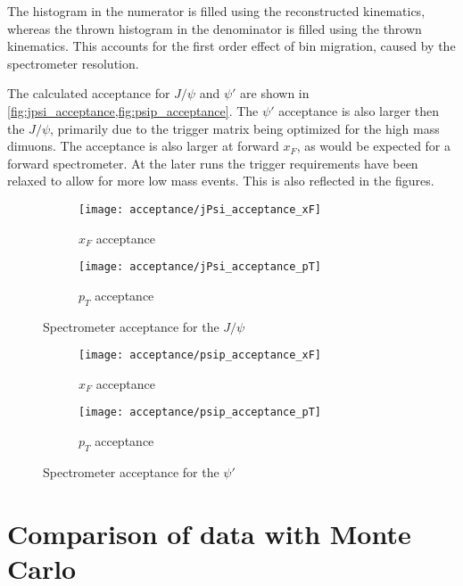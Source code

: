 \documentclass[../main.tex]{subfiles}
\begin{document}
The histogram in the numerator is filled using the reconstructed kinematics, whereas
the thrown histogram in the denominator is filled using the thrown kinematics. This accounts for
the first order effect of bin migration, caused by the spectrometer resolution.


The calculated acceptance for $J/\psi$ and $\psi'$ are shown in \cref{fig:jpsi_acceptance,fig:psip_acceptance}.
The $\psi'$ acceptance is also larger then the $J/\psi$, primarily due to the
trigger matrix being optimized for the high mass dimuons. The acceptance is also larger at forward $x_F$,
as would be expected for a forward spectrometer.
At the later runs the trigger requirements have been relaxed to allow for more low mass events.
This is also reflected in the figures.
\begin{figure}[h!]
	\centering
	\begin{subfigure}{0.45\linewidth}
		\texttt{[image: acceptance/jPsi\_acceptance\_xF]}
		\caption{$x_F$ acceptance}
	\end{subfigure}
	\begin{subfigure}{0.45\linewidth}
		\texttt{[image: acceptance/jPsi\_acceptance\_pT]}
		\caption{$p_T$ acceptance}
	\end{subfigure}
	\caption{Spectrometer acceptance for the $J/\psi$}
	\label{fig:jpsi_acceptance}
\end{figure}
\begin{figure}[h!]
	\centering
	\begin{subfigure}{0.45\linewidth}
		\texttt{[image: acceptance/psip\_acceptance\_xF]}
		\caption{$x_F$ acceptance}
	\end{subfigure}
	\begin{subfigure}{0.45\linewidth}
		\texttt{[image: acceptance/psip\_acceptance\_pT]}
		\caption{$p_T$ acceptance}
	\end{subfigure}
	\caption{Spectrometer acceptance for the $\psi'$}
	\label{fig:psip_acceptance}
\end{figure}
\section{Comparison of data with Monte Carlo}
\end{document}
